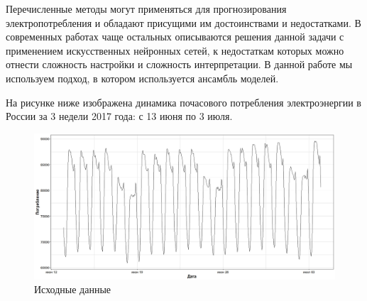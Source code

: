 \documentclass[60x84/16,8pt]{ittmm}
\begin{document}
Перечисленные методы могут применяться для прогнозирования электропотребления и
обладают присущими им достоинствами и недостатками. В современных работах чаще
остальных описываются решения данной задачи с применением искусственных
нейронных сетей, к недостаткам которых можно отнести сложность настройки и
сложность интерпретации. В данной работе мы используем подход, в котором
используется ансамбль моделей.

На рисунке ниже изображена динамика почасового потребления электроэнергии в
России за 3 недели 2017 года: с 13 июня по 3 июля.
\begin{figure}
  \centering
  \includegraphics[width=0.8\linewidth]{Ru/train_dataset.jpeg}
  \caption{Исходные данные}
  \label{fig:data}
\end{figure}
\end{document}
